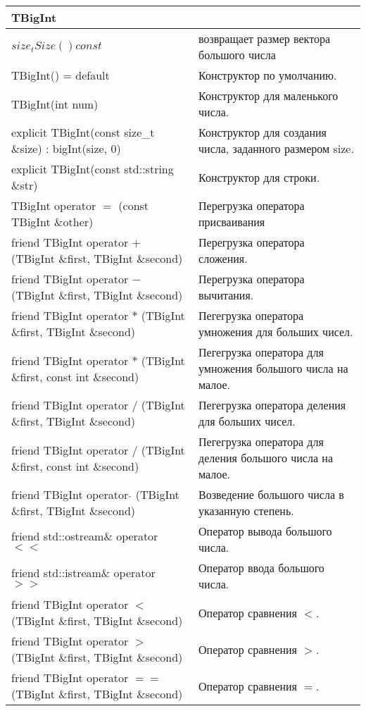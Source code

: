 \begin{longtable}{|p{7.5cm}|p{7.5cm}|}
    \hline
    \rowcolor{lightgray}
    \multicolumn{2}{|c|} {TBigInt}\\
    \hline
    $size_t Size() const$&возвращает размер вектора большого числа\\
    \hline
    \hline
    TBigInt() = default&Конструктор по умолчанию.\\
    \hline
    TBigInt(int num)&Конструктор для маленького числа.\\
    \hline
    explicit TBigInt(const size\_t \&size) : bigInt(size, 0) {}&Конструктор для создания числа, заданного размером size.\\
    \hline
    explicit TBigInt(const std::string \&str)&Конструктор для строки.\\
    \hline
    \hline
    TBigInt operator $=$ (const TBigInt \&other)&Перегрузка оператора присваивания\\
    \hline
    \hline
    friend TBigInt operator $+$ (TBigInt \&first, TBigInt \&second)&Перегрузка оператора сложения.\\
    \hline
    \hline
    friend TBigInt operator $-$ (TBigInt \&first, TBigInt \&second)&Перегрузка оператора вычитания.\\
    \hline
    \hline
    friend TBigInt operator $*$ (TBigInt \&first, TBigInt \&second)&Пегегрузка оператора умножения для больших чисел.\\
    \hline
    \hline
    friend TBigInt operator $*$ (TBigInt \&first, const int \&second)&Пегегрузка оператора для умножения большого числа на малое.\\
    \hline
    \hline
    friend TBigInt operator $/$ (TBigInt \&first, TBigInt \&second)&Пегегрузка оператора деления для больших чисел.\\
    \hline
    \hline
    friend TBigInt operator $/$ (TBigInt \&first, const int \&second)&Пегегрузка оператора для деления большого числа на малое.\\
    \hline
    \hline
    friend TBigInt operator $\hat{}$ (TBigInt \&first, TBigInt \&second)&Возведение большого числа в указанную степень.\\
    \hline
    \hline
    friend std::ostream\& operator $<<$&Оператор вывода большого числа.\\
    \hline
    \hline
    friend std::istream\& operator $>>$&Оператор ввода большого числа.\\
    \hline
    \hline
    friend TBigInt operator $<$ (TBigInt \&first, TBigInt \&second)&Оператор сравнения $<$.\\
    \hline
    \hline
    friend TBigInt operator $>$ (TBigInt \&first, TBigInt \&second)&Оператор сравнения $>$.\\
    \hline
    \hline
    friend TBigInt operator $==$ (TBigInt \&first, TBigInt \&second)&Оператор сравнения $=$.\\
    \hline
\end{longtable}

